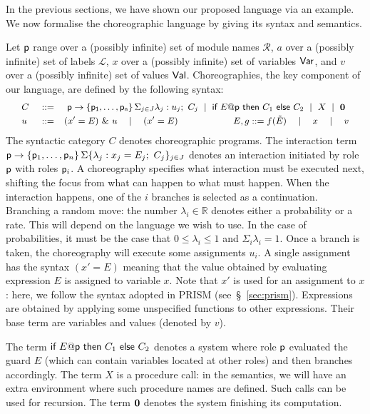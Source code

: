 In the previous sections, we have shown our proposed language via an
example. We now formalise the choreographic language by giving its
syntax and semantics.

%
Let $\mathsf{p}$ range over a (possibly infinite) set of module names
$\mathcal R$, $a$ over a (possibly infinite) set of labels
$\mathcal L$, $x$ over a (possibly infinite) set of variables
$\mathsf{Var}$, and $v$ over a (possibly infinite) set of values
$\mathsf{Val}$.
%
Choreographies, the key component of our language, are defined by the
following syntax:
%
\begin{displaymath}\small
  \begin{array}{llllllllllll}
    C \ & ::= & \
      \interact{p}{\role p_1,\ldots,\role p_n}
      \ \mid\
      \ifTE {E}{p}{C_1}{C_2}
      \ \mid\ X \ \mid\  \CEnd
    \\[1mm]
    u     & ::=  & (x' = E)\ \&\ u \quad\mid\quad    (x' = E)
    \qquad\qquad\qquad
    E, g     ::=        f(\tilde E)\quad\mid\quad x\quad\mid\quad v

  \end{array}
\end{displaymath}
The syntactic category $C$ denotes choreographic programs. The
interaction term
$\mathsf{p}\rightarrow \{\mathsf{p}_1,\ldots,\mathsf{p}_n\}\,\Sigma\{\lambda_j:
x_j=E_j;\ C_j\}_{j\in J}$ denotes an interaction initiated by role
$\mathsf{p}$ with roles $\mathsf{p}_i$. A choreography specifies what
interaction must be executed next, shifting the focus from what can
happen to what must happen. When the interaction happens, one of the
$i$ branches is selected as a continuation. Branching a random move:
the number $\lambda_i\in\mathbb R$ denotes either a probability or a
rate. This will depend on the language we wish to use. In the case of
probabilities, it must be the case that $0\leq\lambda_i\leq 1$ and
$\Sigma_i\lambda_i=1$. Once a branch is taken, the choreography will
execute some assignments $u_i$. A single assignment has the syntax
$(x' = E)$ meaning that the value obtained by evaluating expression
$E$ is assigned to variable $x$. Note that $x'$ is used for an
assignment to $x$: here, we follow the syntax adopted in PRISM
(see~\S~\ref{sec:prism}). Expressions are obtained by applying some
unspecified functions to other expressions. Their base term are
variables and values (denoted by $v$).
%

The term
$\textsf{if } E@\mathsf{p} \textsf{ then } C_1 \textsf{ else } C_2$
denotes a system where role $\mathsf{p}$ evaluated the guard $E$ (which
can contain variables located at other roles) and then branches
accordingly.  The term $X$ is a procedure call: in the semantics, we
will have an extra environment where such procedure names are
defined. Such calls can be used for recursion. The term $\mathbf{0}$
denotes the system finishing its computation.

